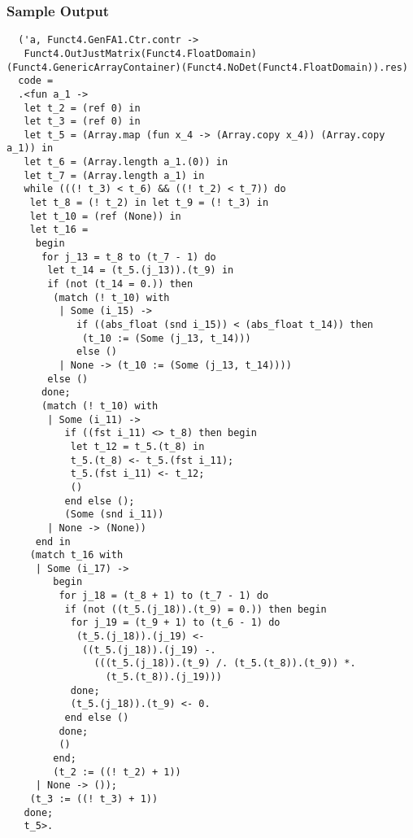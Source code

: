 \documentclass{beamer}
\begin{document}
\begin{frame}[fragile]
    \frametitle{Sample Output}
\begin{small}
\begin{verbatim}
  ('a, Funct4.GenFA1.Ctr.contr ->
   Funct4.OutJustMatrix(Funct4.FloatDomain)(Funct4.GenericArrayContainer)(Funct4.NoDet(Funct4.FloatDomain)).res)
  code =
  .<fun a_1 ->
   let t_2 = (ref 0) in
   let t_3 = (ref 0) in
   let t_5 = (Array.map (fun x_4 -> (Array.copy x_4)) (Array.copy a_1)) in
   let t_6 = (Array.length a_1.(0)) in
   let t_7 = (Array.length a_1) in
   while (((! t_3) < t_6) && ((! t_2) < t_7)) do
    let t_8 = (! t_2) in let t_9 = (! t_3) in
    let t_10 = (ref (None)) in
    let t_16 =
     begin
      for j_13 = t_8 to (t_7 - 1) do
       let t_14 = (t_5.(j_13)).(t_9) in
       if (not (t_14 = 0.)) then
        (match (! t_10) with
         | Some (i_15) ->
            if ((abs_float (snd i_15)) < (abs_float t_14)) then
             (t_10 := (Some (j_13, t_14)))
            else ()
         | None -> (t_10 := (Some (j_13, t_14))))
       else ()
      done;
      (match (! t_10) with
       | Some (i_11) ->
          if ((fst i_11) <> t_8) then begin
           let t_12 = t_5.(t_8) in
           t_5.(t_8) <- t_5.(fst i_11);
           t_5.(fst i_11) <- t_12;
           ()
          end else ();
          (Some (snd i_11))
       | None -> (None))
     end in
    (match t_16 with
     | Some (i_17) ->
        begin
         for j_18 = (t_8 + 1) to (t_7 - 1) do
          if (not ((t_5.(j_18)).(t_9) = 0.)) then begin
           for j_19 = (t_9 + 1) to (t_6 - 1) do
            (t_5.(j_18)).(j_19) <-
             ((t_5.(j_18)).(j_19) -.
               (((t_5.(j_18)).(t_9) /. (t_5.(t_8)).(t_9)) *.
                 (t_5.(t_8)).(j_19)))
           done;
           (t_5.(j_18)).(t_9) <- 0.
          end else ()
         done;
         ()
        end;
        (t_2 := ((! t_2) + 1))
     | None -> ());
    (t_3 := ((! t_3) + 1))
   done;
   t_5>.


\end{verbatim}
\end{small}
\end{frame}
\end{document}
